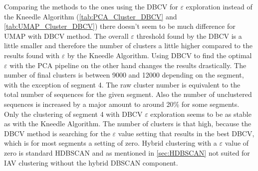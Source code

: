 Comparing the methods to the ones using the \gls{DBCV} for $\varepsilon$ exploration instead of the Kneedle Algorithm (\autoref{tab:PCA_Cluster_DBCV} and \autoref{tab:UMAP_Cluster_DBCV}) there doesn't seem to be much difference for \gls{UMAP} with \gls{DBCV} method. The overall $\varepsilon$ threshold found by the \gls{DBCV} is a little smaller and therefore the number of clusters a little higher compared to the results found with $\varepsilon$ by the Kneedle Algorithm. Using \gls{DBCV} to find the optimal $\varepsilon$ with the \gls{PCA} pipeline on the other hand changes the results drastically. The number of final clusters is between 9000 and 12000 depending on the segment, with the exception of segment 4. The raw cluster number is equivalent to the total number of sequences for the given segment. Also the number of unclustered sequences is increased by a major amount to around 20\% for some segments. Only the clustering of segment 4 with \gls{DBCV} $\varepsilon$ exploration seems to be as stable as with the Kneedle Algorithm. The number of clusters is that high, because the \gls{DBCV} method is searching for the $\varepsilon$ value setting that results in the best \gls{DBCV}, which is for most segments a setting of zero. Hybrid clustering with a $\varepsilon$ value of zero is standard \gls{HDBSCAN} and as mentioned in \autoref{sec:HDBSCAN} not suited for \gls{IAV} clustering without the hybrid \gls{DBSCAN} component.   


